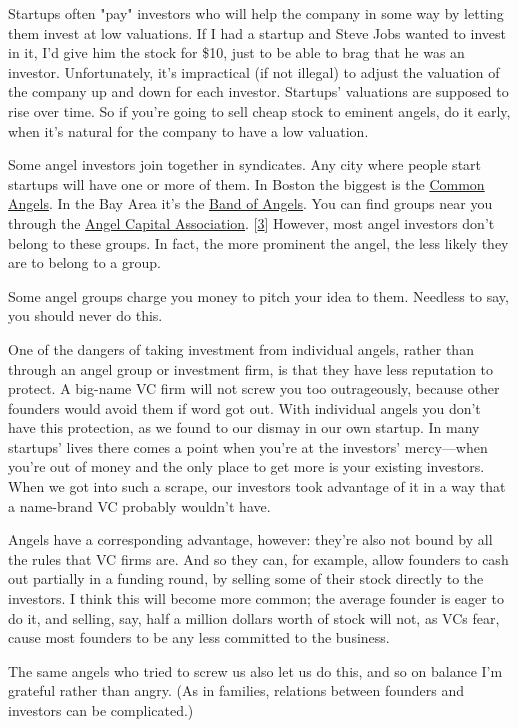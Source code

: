 Startups often "pay" investors who will help the company in some
way by letting them invest at low valuations.  If I had a startup
and Steve Jobs wanted to invest in it, I'd give him the stock for
\$10, just to be able to brag that he was an investor.  Unfortunately,
it's impractical (if not illegal) to adjust the valuation of the
company up and down for each investor.  Startups' valuations are
supposed to rise over time.  So if you're going to sell cheap stock
to eminent angels, do it early, when it's natural for the company
to have a low valuation.

Some angel investors join together in syndicates.  Any city where
people start startups will have one or more of them.  In Boston the
biggest is the \href{http://commonangels.com/home.html}{Common
Angels}.  In the Bay Area it's the \href{http://bandangels.com/}{Band
of Angels}.  You can find groups near you through the \href{http://angelcapitalassociation.org/}{Angel Capital Association}.
[\href{\#f3n}{3}]
However, most angel investors don't belong to these groups.  In
fact, the more prominent the angel, the less likely they are to
belong to a group.

Some angel groups charge you money to pitch your idea to them.
Needless to say, you should never do this.

One of the dangers of taking investment from individual angels,
rather than through an angel group or investment firm, is that they
have less reputation to protect.  A big-name VC firm will not screw
you too outrageously, because other founders would avoid them if
word got out.  With individual angels you don't have this protection,
as we found to our dismay in our own startup.  In many startups'
lives there comes a point when you're at the investors' 
mercy---when you're out of money and the only place to get more is your
existing investors.  When we got into such a scrape, our investors
took advantage of it in a way that a name-brand VC probably wouldn't
have.

Angels have a corresponding advantage, however: they're also not
bound by all the rules that VC firms are.  And so they can, for
example, allow founders to cash out partially in a funding round,
by selling some of their stock directly to the investors.  I think
this will become more common; the average founder is eager to do
it, and selling, say, half a million dollars worth of stock will
not, as VCs fear, cause most founders to be any less committed to
the business.

The same angels who tried to screw us also let us do this, and so
on balance I'm grateful rather than angry.  (As in families, relations
between founders and investors can be complicated.)

